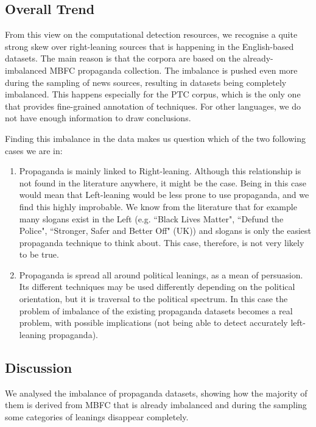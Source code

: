 \subsection{Overall Trend}
From this view on the computational detection resources, we recognise a quite strong skew over right-leaning sources that is happening in the English-based datasets.
The main reason is that the corpora are based on the already-imbalanced MBFC propaganda collection. The imbalance is pushed even more during the sampling of news sources, resulting in datasets being completely imbalanced.
This happens especially for the PTC corpus, which is the only one that provides fine-grained annotation of techniques.
For other languages, we do not have enough information to draw conclusions.

Finding this imbalance in the data makes us question which of the two following cases we are in:

\begin{enumerate}
    \item Propaganda is mainly linked to Right-leaning. Although this relationship is not found in the literature anywhere, it might be the case. Being in this case would mean that Left-leaning would be less prone to use propaganda, and we find this highly improbable. We know from the literature that for example many slogans exist in the Left (e.g. ``Black Lives Matter", ``Defund the Police", ``Stronger, Safer and Better Off" (UK)) and slogans is only the easiest propaganda technique to think about. This case, therefore, is not very likely to be true.
    \item Propaganda is spread all around political leanings, as a mean of persuasion. Its different techniques may be used differently depending on the political orientation, but it is traversal to the political spectrum. In this case
    the problem of imbalance of the existing propaganda datasets becomes a real problem, with possible implications (not being able to detect accurately left-leaning propaganda).
\end{enumerate}

\subsection{Discussion}
We analysed the imbalance of propaganda datasets, showing how the majority of them is derived from MBFC that is already imbalanced and during the sampling some categories of leanings disappear completely. 


